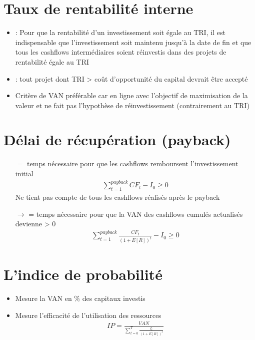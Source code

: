 \section{Taux de rentabilité interne}

\begin{itemize}
    \item {} : Pour que la rentabilité d’un investissement soit égale au TRI, il est indispensable que l’investissement soit maintenu jusqu’à la date de fin et que tous les cashflows intermédiaires soient réinvestis dans des projets de rentabilité égale au TRI
    \item {} : tout projet dont TRI > coût d'opportunité du capital devrait être accepté
    \item Critère de VAN préférable car en ligne avec l'objectif de maximisation de la valeur et ne fait pas l'hypothèse de réinvestissement (contrairement au TRI)
\end{itemize}

\section{Délai de récupération (payback)}

\begin{itemize}
    \item[$=$] temps nécessaire pour que les cashflows remboursent l'investissement initial
    \begin{align*}
        \sum_{t=1}^{payback} CF_t - I_0 \geq 0
    \end{align*}
    \warning Ne tient pas compte de tous les cashflows réalisés après le payback
    \item[$\rightarrow$]  = temps nécessaire pour que la VAN des cashflows cumulés actualisés devienne > 0
    \begin{align*}
        \sum_{t=1}^{payback} \frac{CF_t}{(1 + E[R])^t} - I_0 \geq 0
    \end{align*}
\end{itemize}

\section{L'indice de probabilité}

\begin{itemize}
    \item Mesure la VAN en \% des capitaux investis
    \item Mesure l'efficacité de l'utilisation des ressources
    \begin{align*}
        IP = \frac{VAN}{\sum_{t=0}^T \frac{I_t}{(1+E[R])^t}}
    \end{align*}
\end{itemize}

